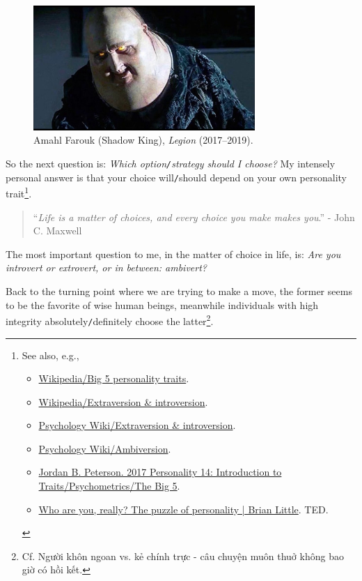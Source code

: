 \documentclass[12pt]{article}
\numberwithin{equation}{section}
\begin{document}
\begin{figure}[H]
    \centering
    \includegraphics[width=0.75\textwidth]{Shadow_King}
    \caption{Amahl Farouk (Shadow King), \textit{Legion} (2017--2019).}
    \label{fig3}
\end{figure}
So the next question is: \textit{Which option\texttt{/}strategy should I choose?} My intensely personal answer is that your choice will\texttt{/}should depend on your own personality trait\footnote{See also, e.g.,
    \begin{itemize}
        \item \href{https://en.wikipedia.org/wiki/Big_Five_personality_traits}{Wikipedia/Big 5 personality traits}.
        \item \href{https://en.wikipedia.org/wiki/Extraversion_and_introversion}{Wikipedia/Extraversion \& introversion}.
        \item \href{https://psychology.wikia.org/wiki/Extraversion_and_introversion}{Psychology Wiki/Extraversion \& introversion}.
        \item \href{https://psychology.wikia.org/wiki/Ambiversion}{Psychology Wiki/Ambiversion}.
        \item \href{https://www.youtube.com/watch?v=pCceO_D4AlY}{Jordan B. Peterson. 2017 Personality 14: Introduction to Traits/Psychometrics/The Big 5}.
        \item \href{https://www.youtube.com/watch?v=qYvXk_bqlBk}{Who are you, really? The puzzle of personality | Brian Little}. TED.
    \end{itemize}}.
\begin{quotation}
    ``\textit{Life is a matter of choices, and every choice you make makes you}.'' - John C. Maxwell
\end{quotation}
The most important question to me, in the matter of choice in life, is: \textit{Are you introvert or extrovert, or in between: ambivert?}

Back to the turning point where we are trying to make a move, the former seems to be the favorite of wise human beings, meanwhile individuals with high integrity absolutely\texttt{/}definitely choose the latter\footnote{Cf. Người khôn ngoan vs. kẻ chính trực - câu chuyện muôn thuở không bao giờ có hồi kết.}.
\end{document}
